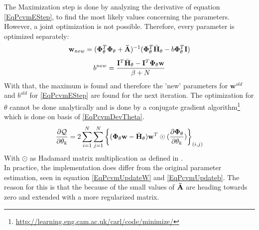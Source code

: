 The Maximization step is done by analyzing the derivative of equation \ref{EqPcvmEStep}, to find the most likely values concerning the parameters.
However, a joint optimization is not possible. Therefore, every parameter is optimized separately:\cite{Chen.2009}
\begin{equation}\label{EqPcvmUpdateW}
\mathbf{w}_{new} = (\mathbf{\Phi}_\theta^T \mathbf{\Phi}_\theta + \mathbf{\bar{A}})^{-1} (\mathbf{\Phi}_\theta^T \bar{\mathbf{H}}_\theta - b\mathbf{\Phi}_\theta^T \mathbf{I})
\end{equation}
\begin{equation}\label{EqPcvmUpdateb}
b^{new} = \frac{\mathbf{I}^T \bar{\mathbf{H}}_\theta - \mathbf{I}^T \mathbf{\Phi}_\theta \mathbf{w}}{\beta + N}
\end{equation}
With that, the maximum is found and therefore the 'new' parameters for $\mathbf{w}^{old}$ and $b^{old}$ for \ref{EqPcvmEStep} are found for the next iteration.
The optimization for $\theta$ cannot be done analytically and is done by a conjugate gradient algorithm\footnote{\url{http://learning.eng.cam.ac.uk/carl/code/minimize/}} which is done on basis of \eqref{EqPcvmDevTheta}.\cite{Chen.2009}
\begin{equation}\label{EqPcvmDevTheta}
\frac{\partial \mathcal{Q}}{\partial \mathbf{\theta}_k } = 2 \sum_{i=1}^{N}\sum_{j=1}^{N} \bigg\{ (\mathbf{\Phi}_\theta \mathbf{w} - \bar{\mathbf{H}}_\theta) \mathbf{w}^T \odot (\frac{\partial\mathbf{\Phi}_\theta}{\partial \theta_k} ) \bigg\}_{(i,j)}
\end{equation}
With $\odot$ as Hadamard matrix multiplication as defined in \cite{CaroLopera.2012}.\\
In practice, the implementation does differ from the original parameter estimation, seen in equation \ref{EqPcvmUpdateW} and \ref{EqPcvmUpdateb}. 
The reason for this is that the because of the small values of $\mathbf{\bar{A}}$ are heading towards zero and extended with a more regularized matrix.\cite{Chen.2009} 

